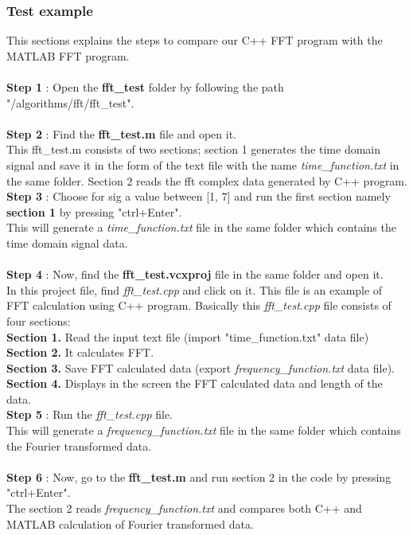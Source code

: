 \subsubsection{Test example}
This sections explains the steps to compare our C++ FFT program with the MATLAB FFT program.\\ \\
\textbf{Step 1} : Open the \textbf{fft\_test} folder by following the path "/algorithms/fft/fft\_test".\\ \\
\textbf{Step 2} : Find the \textbf{fft\_test.m} file and open it.\\
This fft\_test.m consists of two sections; section 1 generates the time domain signal and save it in the form of the text file with the name \textit{time\_function.txt} in the same folder. Section 2 reads the fft complex data generated by C++ program.\\

\textbf{Step 3} : Choose for sig a value between [1, 7] and run the first section namely \textbf{section 1} by pressing "ctrl+Enter".\\
This will generate a \textit{time\_function.txt} file in the same folder which contains the time domain signal data.\\ \\
\textbf{Step 4} : Now, find the \textbf{fft\_test.vcxproj} file in the same folder and open it.\\
In this project file, find \textit{fft\_test.cpp} and click on it. This file is an example of FFT calculation using C++ program. Basically this \textit{fft\_test.cpp} file consists of four sections:\\
\textbf{Section 1.} Read the input text file (import "time\_function.txt" data file)\\
\textbf{Section 2.} It calculates FFT.\\
\textbf{Section 3.} Save FFT calculated data (export \textit{frequency\_function.txt} data file).\\
\textbf{Section 4.}  Displays in the screen the FFT calculated data and length of the data.\\

\textbf{Step 5} : Run the \textit{fft\_test.cpp} file.\\
This will generate a \textit{frequency\_function.txt} file in the same folder which contains the Fourier transformed data.\\ \\
\textbf{Step 6} : Now, go to the \textbf{fft\_test.m} and run section 2 in the code by pressing "ctrl+Enter".\\
The section 2 reads \textit{frequency\_function.txt} and compares both C++ and MATLAB calculation of Fourier transformed data.


